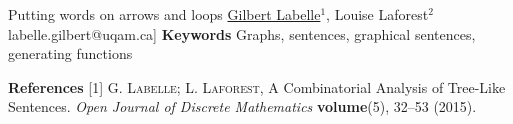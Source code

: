 \begin{abstract_online}{Putting words on arrows and loops}{%
        \underline{Gilbert Labelle}$^{1}$, Louise Laforest$^{2}$}{labelle.gilbert@uqam.ca]
        }
\textbf{Keywords} \newline{} Graphs, sentences, graphical sentences, generating functions

\textbf{References} \newline{}
[1] \textsc{G. Labelle; L. Laforest}, A Combinatorial Analysis of Tree-Like Sentences. \emph{Open Journal of Discrete Mathematics} \textbf{volume}(5), 32--53 (2015). \newline{}
 \newline{}
\end{abstract_online}
    